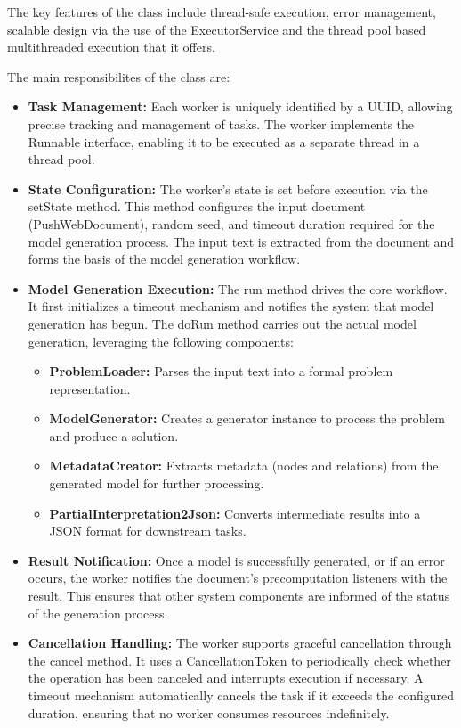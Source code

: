 			The key features of the class include thread-safe execution, error management, scalable design via the use of the ExecutorService
			and the thread pool based multithreaded execution that it offers.

			The main responsibilites of the class are:
			\begin{itemize}
				\item{\textbf{Task Management:}} Each worker is uniquely identified by a UUID, allowing precise tracking and management of tasks.
				The worker implements the Runnable interface, enabling it to be executed as a separate thread in a thread pool.
				\item{\textbf{State Configuration:}} The worker’s state is set before execution via the setState method. This method configures the input document (PushWebDocument), random seed, and timeout duration required for the model generation process.
				The input text is extracted from the document and forms the basis of the model generation workflow.
				\item{\textbf{Model Generation Execution:}} The run method drives the core workflow. It first initializes a timeout mechanism and notifies the system that model generation has begun.
				The doRun method carries out the actual model generation, leveraging the following components:
				\begin{itemize}
					\item {\textbf{ProblemLoader:}} Parses the input text into a formal problem representation.
					\item {\textbf{ModelGenerator:}} Creates a generator instance to process the problem and produce a solution.
					\item {\textbf{MetadataCreator:}} Extracts metadata (nodes and relations) from the generated model for further processing.
					\item {\textbf{PartialInterpretation2Json:}} Converts intermediate results into a JSON format for downstream tasks.
				\end{itemize}
				\item{\textbf{Result Notification:}} Once a model is successfully generated, or if an error occurs, the worker notifies the document's precomputation listeners with the result. This ensures that other system components are informed of the status of the generation process.
				\item{\textbf{Cancellation Handling:}} The worker supports graceful cancellation through the cancel method. It uses a CancellationToken to periodically check whether the operation has been canceled and interrupts execution if necessary.
				A timeout mechanism automatically cancels the task if it exceeds the configured duration, ensuring that no worker consumes resources indefinitely.
			\end{itemize}

